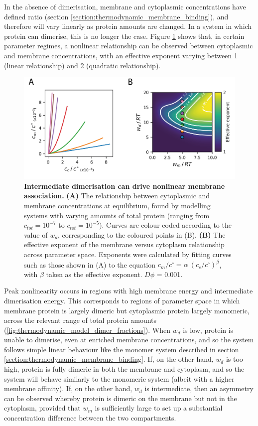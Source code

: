 \documentclass[12pt]{"report"}
\newcommand{\mycaption}[2]{\caption[#1]{\textbf{#1.} #2}}
\begin{document}
In the absence of dimerisation, membrane and cytoplasmic concentrations have defined ratio (section \ref{section:thermodynamic_membrane_binding}), and therefore will vary linearly as protein amounts are changed. In a system in which protein can dimerise, this is no longer the case. Figure \ref{fig:thermodynamic_model_feedback} shows that, in certain parameter regimes, a nonlinear relationship can be observed between cytoplasmic and membrane concentrations, with an effective exponent varying between 1 (linear relationship) and 2 (quadratic relationship).\\

\begin{figure}
\includegraphics[scale=1]{thermodynamic_model_feedback}
\centering
\mycaption{Intermediate dimerisation can drive nonlinear membrane association}{
\textbf{(A)} The relationship between cytoplasmic and membrane concentrations at equilibrium, found by modelling systems with varying amounts of total protein (ranging from $c_{tot} = 10^{-7}$ to $c_{tot} = 10^{-5}$). Curves are colour coded according to the value of $w_d$, corresponding to the coloured points in (B).
\textbf{(B)} The effective exponent of the membrane versus cytoplasm relationship across parameter space. Exponents were calculated by fitting curves such as those shown in (A) to the equation $c_m/c^{\circ} = \alpha \: (c_c/c^{\circ})^{\beta}$, with $\beta$ taken as the effective exponent. $D\phi$ = 0.001.
}
\label{fig:thermodynamic_model_feedback}
\end{figure}

Peak nonlinearity occurs in regions with high membrane energy and intermediate dimerisation energy. This corresponds to regions of parameter space in which membrane protein is largely dimeric but cytoplasmic protein largely monomeric, across the relevant range of total protein amounts (\cref{fig:thermodynamic_model_dimer_fractions}). When $w_d$ is low, protein is unable to dimerise, even at enriched membrane concentrations, and so the system follows simple linear behaviour like the monomer system described in section \ref{section:thermodynamic_membrane_binding}. If, on the other hand, $w_d$ is too high, protein is fully dimeric in both the membrane and cytoplasm, and so the system will behave similarly to the monomeric system (albeit with a higher membrane affinity). If, on the other hand, $w_d$ is intermediate, then an asymmetry can be observed whereby protein is dimeric on the membrane but not in the cytoplasm, provided that $w_m$ is sufficiently large to set up a substantial concentration difference between the two compartments.\\
\end{document}
